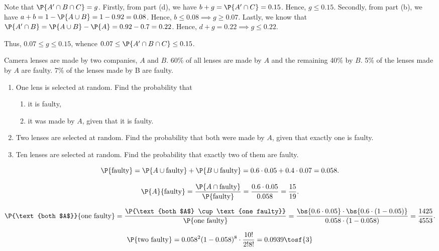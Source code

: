 \begin{solution}
\begin{ppart}
        Note that $\P{A' \cap B \cap C} = g$. Firstly, from part (d), we have $b + g = \P{A' \cap C} = 0.15$. Hence, $g \leq 0.15$. Secondly, from part (b), we have $a + b = 1 - \P{A \cup B} = 1 - 0.92 = 0.08$. Hence, $b \leq 0.08 \implies g \geq 0.07$. Lastly, we know that $\P{A' \cap B} = \P{A \cup B} - \P{A} = 0.92 - 0.7 = 0.22$. Hence, $d + g = 0.22 \implies g \leq 0.22$.

        Thus, $0.07 \leq g \leq 0.15$, whence $0.07 \leq \P{A' \cap B \cap C} \leq 0.15$.
    \end{ppart}
\end{solution}

\begin{problem}
    Camera lenses are made by two companies, $A$ and $B$. 60\% of all lenses are made by $A$ and the remaining 40\% by $B$. 5\% of the lenses made by $A$ are faulty. 7\% of the lenses made by B are faulty.
    \begin{enumerate}
        \item One lens is selected at random. Find the probability that
        \begin{enumerate}
            \item it is faulty,
            \item it was made by $A$, given that it is faulty.
        \end{enumerate}
        \item Two lenses are selected at random. Find the probability that both were made by $A$, given that exactly one is faulty.
        \item Ten lenses are selected at random. Find the probability that exactly two of them are faulty.
    \end{enumerate}
\end{problem}
\begin{solution}
    \begin{ppart}
        \begin{psubpart}
            \[\P{\text{faulty}} = \P{A \cup \text{faulty}} + \P{B \cup \text{faulty}} = 0.6 \cdot 0.05 + 0.4 \cdot 0.07 = 0.058.\]
        \end{psubpart}
        \begin{psubpart}
            \[\P{A}{\text{faulty}} = \frac{\P{A \cap \text{faulty}}}{\P{\text{faulty}}} = \frac{0.6 \cdot 0.05}{0.058} = \frac{15}{19}.\]
        \end{psubpart}
    \end{ppart}
    \begin{ppart}
        \[\P{\text{both $A$}}{\text{one faulty}} = \frac{\P{\text{both $A$} \cup \text{one faulty}}}{\P{\text{one faulty}}} = \frac{\bs{0.6 \cdot 0.05} \cdot \bs{0.6 \cdot (1 - 0.05)}}{0.058 \cdot (1 - 0.058)} = \frac{1425}{4553}.\]
    \end{ppart}
    \begin{ppart}
        \[\P{\text{two faulty}} = 0.058^2 (1 - 0.058)^8 \cdot \frac{10!}{2! 8!} = 0.0939 \tosf{3}\]
    \end{ppart}
\end{solution}


